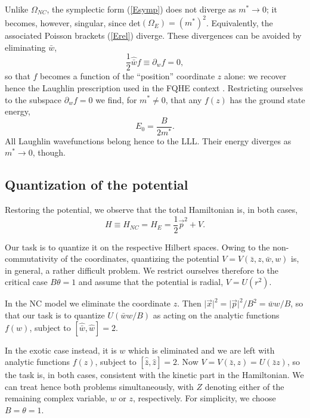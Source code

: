 \documentclass[a4paper,11pt]{article}
\newcommand{\half}{{\scriptstyle{\frac{1}{2}}}}
\newcommand{\vx}{{\vec x}}
\def\p{{\partial}}
\def\vp{{\vec p}}
\def\vx{{\vec x}}
\begin{document}
Unlike $\Omega_{NC}$, the symplectic form (\ref{Esymp}) does not
diverge as $m^*\to0$; it becomes, however,
singular,  since det$(\Omega_{E})=(m^*)^2$.
Equivalently, the associated Poisson brackets (\ref{Erel}) diverge.
These divergences can be avoided by eliminating $\bar{w}$,
\begin{equation}
\half\widehat{\bar{w}}f\equiv\p_{w}f=0,
\label{Econd}
\end{equation}
so that $f$ becomes a function of
the ``position'' coordinate $z$ alone: we recover  hence the
Laughlin prescription used in the FQHE context
\cite{QHE}.
Restricting ourselves to the subspace $\p_{w}f=0$
  we find, for $m^*\neq0$,
that  any $f(z)$ has the ground state energy,
\begin{equation}
     E_{0}=\frac{B}{2m^*}.
\label{Egroundenergy}
\end{equation}
All Laughlin wavefunctions belong hence to the LLL.
Their energy diverges as $m^*\to0$, though.
\goodbreak

\subsection{Quantization of the potential}
\label{quantization}

Restoring the potential, we observe that
  the  total Hamiltonian is, in both cases,
\begin{equation}
H\equiv H_{NC}=H_{E}=\half{\vp^2}+V.
\label{hamiltonian}
\end{equation}

  Our task is to quantize it on the respective Hilbert spaces.
  Owing to the non-commutativity of the coordinates,
quantizing the potential $V=V(\bar{z}, z, \bar{w},w)$
is, in general, a rather difficult
problem. We restrict ourselves therefore to the critical case
$B\theta=1$ and assume that the potential is radial,
$V=U(r^2)$.


In the NC model we eliminate the coordinate $z$. Then
$\vert\vx\vert^2=\vert\vp\vert^2/B^2=\bar{w}w/B$, so that
our task is to quantize
$U(\bar{w}w/B)$ as acting on the analytic functions
$f(w)$, subject to $[\widehat{\bar{w}},\widehat{w}]=2$.

In the exotic case instead, it is $w$ which is eliminated and we
are left with analytic functions $f(z)$,
subject to $[\widehat{\bar{z}},\widehat{z}]=2$. Now $V=V(\bar{z},z)
  = U(\bar{z}z)$,
  so the task is,
in both cases, consistent with the kinetic part in the Hamiltonian.
We can treat hence both problems simultaneously,
with $Z$ denoting either of the remaining complex variable,
$w$ or $z$, respectively.
For simplicity, we choose  $B=\theta=1$.
\end{document}
